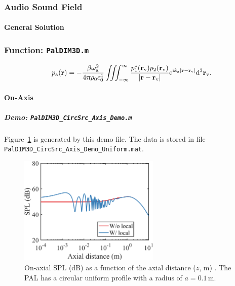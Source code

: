 \documentclass[12pt]{article}
\begin{document}
\subsubsection{Audio Sound Field}

\paragraph{General Solution}

\subsubsection{Function: \lstinline!PalDIM3D.m!}
\begin{equation}
    p_\mathrm{a}(\vb{r})
    =
    -\frac{\beta\omega_\mathrm{a}^2}{4\uppi\rho_0c_0^4}
    \iiint_{-\infty}^\infty
    \frac{
        p_1^*(\vb{r}_\mathrm{v})
        p_2(\vb{r}_\mathrm{v})
    }{\abs{\vb{r}-\vb{r}_\mathrm{v}}}
    \mathrm{e}^{\mathrm{i} k_\mathrm{a} \abs{\vb{r}-\vb{r}_\mathrm{v}}}
    \dd^3 \vb{r}_\mathrm{v}
    .
    \label{eq:dim_3d_audio}
\end{equation}

\paragraph{On-Axis}

\subparagraph{Demo: \lstinline!PalDIM3D_CircSrc_Axis_Demo.m!}
Figure~\ref{fig:dim:uniform:32oj4} is generated by this demo file.
The data is stored in file \lstinline!PalDIM3D_CircSrc_Axis_Demo_Uniform.mat!.
\begin{figure}[!htb]
    \centering
    \includegraphics[width = 0.6\textwidth]{../code/DIM/fig/PalDIM3D_CircSrc_Axis_Demo_Uniform.png}
    \caption{On-axial SPL (dB) as a function of the axial distance ($z$, m) \cite[Fig.~2(d)]{Zhong2022LowFrequencyAudio}.
        The PAL has a circular uniform profile with a radius of $a=0.1\,\mathrm{m}$.
    }
    \label{fig:dim:uniform:32oj4}
\end{figure}
\end{document}
